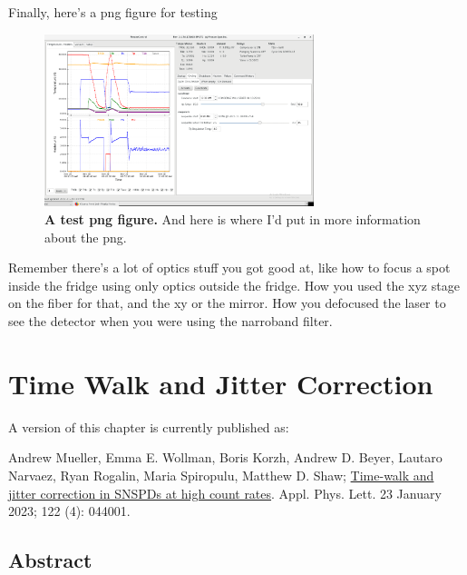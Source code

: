 \documentclass[11pt]{caltech_thesis} %
\begin{document}
Finally, here's a png figure for testing

\hypertarget{fig:test_png_figure}{%
\begin{figure}
\centering
\includegraphics[width=0.7\textwidth,height=\textheight]{chapter_01/figs_01/fridge.png}
\caption[{A png figure.}]{\textbf{A test png figure.} And here is where
I'd put in more information about the png.}
\label{fig:test_png_figure}
\end{figure}
}

Remember there's a lot of optics stuff you got good at, like how to
focus a spot inside the fridge using only optics outside the fridge. How
you used the xyz stage on the fiber for that, and the xy or the mirror.
How you defocused the laser to see the detector when you were using the
narroband filter.

\hypertarget{time-walk-and-jitter-correction}{%
\chapter{Time Walk and Jitter
Correction}\label{time-walk-and-jitter-correction}}

A version of this chapter is currently published as:

Andrew Mueller, Emma E. Wollman, Boris Korzh, Andrew D. Beyer, Lautaro
Narvaez, Ryan Rogalin, Maria Spiropulu, Matthew D. Shaw;
\href{https://pubs.aip.org/aip/apl/article/122/4/044001/2870246/Time-walk-and-jitter-correction-in-SNSPDs-at-high}{Time-walk
and jitter correction in SNSPDs at high count rates}. Appl. Phys. Lett.
23 January 2023; 122 (4): 044001.

\hypertarget{abstract-1}{%
\section{Abstract}\label{abstract-1}}

~~~~~
\end{document}
